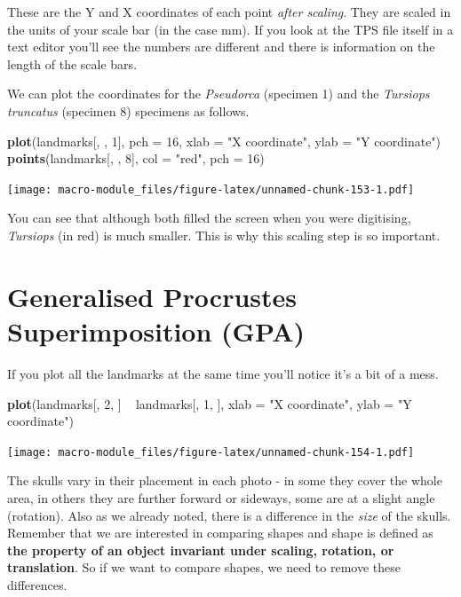 \documentclass[]{book}
\newenvironment{Shaded}{\begin{snugshade}}{\end{snugshade}}
\newcommand{\KeywordTok}[1]{\textcolor[rgb]{0.13,0.29,0.53}{\textbf{{#1}}}}
\newcommand{\DataTypeTok}[1]{\textcolor[rgb]{0.13,0.29,0.53}{{#1}}}
\newcommand{\DecValTok}[1]{\textcolor[rgb]{0.00,0.00,0.81}{{#1}}}
\newcommand{\StringTok}[1]{\textcolor[rgb]{0.31,0.60,0.02}{{#1}}}
\newcommand{\NormalTok}[1]{{#1}}
\theoremstyle{definition}
\theoremstyle{definition}
\theoremstyle{definition}
\theoremstyle{remark}
\begin{document}
These are the Y and X coordinates of each point \emph{after scaling}.
They are scaled in the units of your scale bar (in the case mm). If you
look at the TPS file itself in a text editor you'll see the numbers are
different and there is information on the length of the scale bars.

We can plot the coordinates for the \emph{Pseudorca} (specimen 1) and
the \emph{Tursiops truncatus} (specimen 8) specimens as follows.

\begin{Shaded}
\begin{Highlighting}[]
\KeywordTok{plot}\NormalTok{(landmarks[, , }\DecValTok{1}\NormalTok{], }\DataTypeTok{pch =} \DecValTok{16}\NormalTok{, }\DataTypeTok{xlab =} \StringTok{"X coordinate"}\NormalTok{, }\DataTypeTok{ylab =} \StringTok{"Y coordinate"}\NormalTok{)}
\KeywordTok{points}\NormalTok{(landmarks[, , }\DecValTok{8}\NormalTok{], }\DataTypeTok{col =} \StringTok{"red"}\NormalTok{, }\DataTypeTok{pch =} \DecValTok{16}\NormalTok{)}
\end{Highlighting}
\end{Shaded}

\texttt{[image: macro-module\_files/figure-latex/unnamed-chunk-153-1.pdf]}

You can see that although both filled the screen when you were
digitising, \emph{Tursiops} (in red) is much smaller. This is why this
scaling step is so important.

\section{Generalised Procrustes Superimposition
(GPA)}\label{generalised-procrustes-superimposition-gpa}

If you plot all the landmarks at the same time you'll notice it's a bit
of a mess.

\begin{Shaded}
\begin{Highlighting}[]
\KeywordTok{plot}\NormalTok{(landmarks[, }\DecValTok{2}\NormalTok{, ] ~}\StringTok{ }\NormalTok{landmarks[, }\DecValTok{1}\NormalTok{, ], }\DataTypeTok{xlab =} \StringTok{"X coordinate"}\NormalTok{, }\DataTypeTok{ylab =} \StringTok{"Y coordinate"}\NormalTok{)}
\end{Highlighting}
\end{Shaded}

\texttt{[image: macro-module\_files/figure-latex/unnamed-chunk-154-1.pdf]}

The skulls vary in their placement in each photo - in some they cover
the whole area, in others they are further forward or sideways, some are
at a slight angle (rotation). Also as we already noted, there is a
difference in the \emph{size} of the skulls. Remember that we are
interested in comparing shapes and shape is defined as \textbf{the
property of an object invariant under scaling, rotation, or
translation}. So if we want to compare shapes, we need to remove these
differences.
\end{document}
